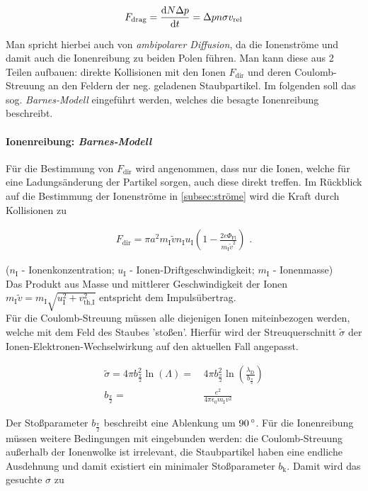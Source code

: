 \documentclass[numbers=noenddot,a4paper]{scrartcl}
\newcommand{\degree}{^\circ}
\newcommand{\diff}{\textnormal{d}}
\newcommand{\ix}[1]{_\text{#1}}
\newcommand{\tilt}[1]{\textit{#1}}
\begin{document}
					\begin{align}
						F\ix{drag}=\frac{\diff N \Delta p}{\diff t}=\Delta p n \sigma v\ix{rel}
					\end{align}
					
				Man spricht hierbei auch von \tilt{ambipolarer Diffusion}, da die Ionenströme und damit auch die Ionenreibung zu beiden Polen führen. Man kann diese aus 2 Teilen aufbauen: direkte Kollisionen mit den Ionen $F\ix{dir}$ und deren Coulomb-Streuung an den Feldern der neg. geladenen Staubpartikel. Im folgenden soll das sog. \tilt{Barnes-Modell} eingeführt werden, welches die besagte Ionenreibung beschreibt.
				
				\paragraph{Ionenreibung: \tilt{Barnes-Modell}}
				
				Für die Bestimmung von $F\ix{dir}$ wird angenommen, dass nur die Ionen, welche für eine Ladungsänderung der Partikel sorgen, auch diese direkt treffen. Im Rückblick auf die Bestimmung der Ionenströme in \ref{subsec:ströme} wird die Kraft durch Kollisionen zu
				
					\begin{align}
						F\ix{dir}=\pi a^2m\ix{I}\tilde{v}n\ix{I}u\ix{I}\left(1-\frac{2e\Phi\ix{Fl}}{m\ix{I}\tilde{v}^2}\right)\,\,.
					\end{align}
					
				($n\ix{I}$ - Ionenkonzentration; $u\ix{I}$ - Ionen-Driftgeschwindigkeit; $m\ix{I}$ - Ionenmasse)\\
				Das Produkt aus Masse und mittlerer Geschwindigkeit der Ionen $m\ix{I}\tilde{v}=m\ix{I}\sqrt{u\ix{I}^2+v\ix{th,I}^2}$ entspricht dem Impulsübertrag.\\
				Für die Coulomb-Streuung müssen alle diejenigen Ionen miteinbezogen werden, welche mit dem Feld des Staubes 'stoßen'. Hierfür wird der Streuquerschnitt $\tilde{\sigma}$ der Ionen-Elektronen-Wechselwirkung auf den aktuellen Fall angepasst.
				
					\begin{align}
						\tilde{\sigma}=4\pi b_{\frac{\pi}{2}}^2\ln\left(\Lambda\right)=&\,4\pi b_{\frac{\pi}{2}}^2\ln\left(\frac{\lambda\ix{D}}{b_{\frac{\pi}{2}}}\right) \\
						b_{\frac{\pi}{2}}=&\,\frac{e^2}{4\pi\epsilon\ix{0}m\ix{I}v^2} \nonumber
					\end{align}
					
				Der Stoßparameter $b_{\frac{\pi}{2}}$ beschreibt eine Ablenkung um $\unit[90]{\degree}$. Für die Ionenreibung müssen weitere Bedingungen mit eingebunden werden: die Coulomb-Streuung außerhalb der Ionenwolke ist irrelevant, die Staubpartikel haben eine endliche Ausdehnung und damit existiert ein minimaler Stoßparameter $b\ix{k}$. Damit wird das gesuchte $\sigma$ zu
				
\end{document}
